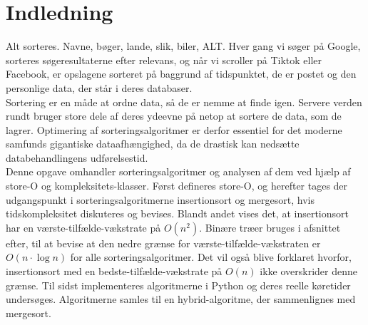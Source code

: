 \chapter*{Indledning}
\label{ch:Indledning}

Alt sorteres. Navne, bøger, lande, slik, biler, ALT. Hver gang vi søger på Google, sorteres søgeresultaterne efter relevans, og når vi scroller på Tiktok eller Facebook, er opslagene sorteret på baggrund af tidspunktet, de er postet og den personlige data, der står i deres databaser.\\

Sortering er en måde at ordne data, så de er nemme at finde igen. Servere verden rundt bruger store dele af deres ydeevne på netop at sortere de data, som de lagrer. Optimering af sorteringsalgoritmer er derfor essentiel for det moderne samfunds gigantiske dataafhængighed, da de drastisk kan nedsætte databehandlingens udførelsestid.\\

Denne opgave omhandler sorteringsalgoritmer og analysen af dem ved hjælp af store-O og kompleksitets-klasser. Først defineres store-O, og herefter tages der udgangspunkt i sorteringsalgoritmerne insertionsort og mergesort, hvis tidskompleksitet diskuteres og bevises. Blandt andet vises det, at insertionsort har en værste-tilfælde-vækstrate på $O(n^2)$. Binære træer bruges i afsnittet efter, til at bevise at den nedre grænse for værste-tilfælde-vækstraten er $O(n \cdot \log n)$ for alle sorteringsalgoritmer. Det vil også blive forklaret hvorfor, insertionsort med en bedste-tilfælde-vækstrate på $O(n)$ ikke overskrider denne grænse. Til sidst implementeres algoritmerne i Python og deres reelle køretider undersøges. Algoritmerne samles til en hybrid-algoritme, der sammenlignes med mergesort.
